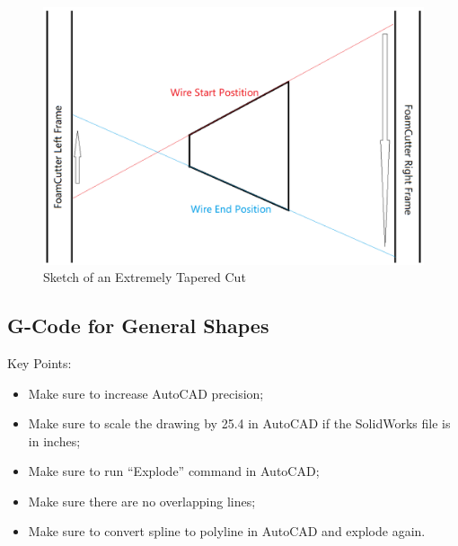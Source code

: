 \documentclass[titlepage,12pt,letter]{report}
\numberwithin{equation}{chapter}
\begin{document}
\begin{figure} [H]
	\includegraphics[width = 0.55\linewidth]{./Figures/wing_example3.png}
	\caption{Sketch of an Extremely Tapered Cut}
	\label{fig:wing3}
\end{figure}

\subsection{G-Code for General Shapes}
\begin{tcolorbox}
	{\large
		\noindent Key Points:
		\begin{itemize}[noitemsep,topsep=0pt]
			\item Make sure to increase AutoCAD precision;
			\item Make sure to scale the drawing by 25.4 in AutoCAD if the SolidWorks file is in inches;
			\item Make sure to run ``Explode'' command in AutoCAD;
			\item Make sure there are no overlapping lines;
			\item Make sure to convert spline to polyline in AutoCAD and explode again.
		\end{itemize}
	}
\end{tcolorbox}
\end{document}

